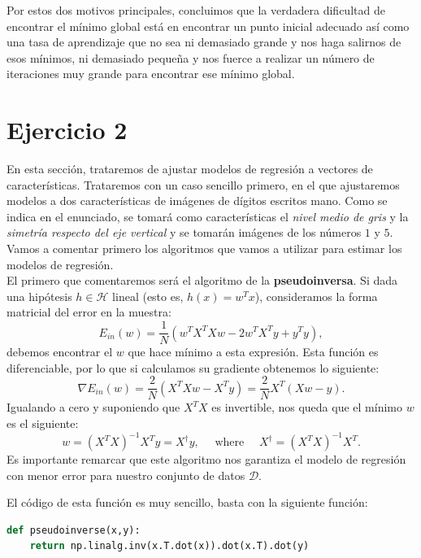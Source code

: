 \documentclass[12pt]{scrartcl}
\begin{document}
{Por estos dos motivos principales, concluimos que la verdadera dificultad de encontrar el mínimo global está en encontrar un punto inicial adecuado así como una tasa de aprendizaje que no sea ni demasiado grande y nos haga salirnos de esos mínimos, ni demasiado pequeña y nos fuerce
a realizar un número de iteraciones muy grande para encontrar ese mínimo global.

\newpage 

\section*{Ejercicio 2}

En esta sección, trataremos de ajustar modelos de regresión a vectores de características. Trataremos con un caso sencillo primero, en el que ajustaremos modelos a dos características
de imágenes de dígitos escritos mano. Como se indica en el enunciado, se tomará como características el \emph{nivel medio de gris} y la \emph{simetría respecto del eje vertical} y se tomarán imágenes de los
números $1$ y $5$. Vamos a comentar primero los algoritmos que vamos a utilizar para estimar los modelos de regresión.\\ 


El primero que comentaremos será el algoritmo de la \textbf{pseudoinversa}. Si dada una hipótesis $h \in \mathcal H$ lineal (esto es, $h(x) = w^T x$), consideramos la forma matricial del error en la muestra:
$$
E_{in}(w) = \frac{1}{N} \left(  w^T X^T X w - 2w^T X^T y + y^T y\right),
$$
debemos encontrar el $w$ que hace mínimo a esta expresión. Esta función es diferenciable, por lo que si calculamos su gradiente obtenemos lo siguiente:
$$
\nabla E_{in}(w) = \frac{2}{N} \left( X^T X w - X^T y\right) = \frac{2}{N} X^T \left(  X w -  y\right).
$$
Igualando a cero y suponiendo que $X^T X$ es invertible, nos queda que el mínimo $w$ es el siguiente:
$$
w = \left(X^T X\right)^{-1} X^T y = X^\dagger y, \quad \text{ where } \quad X^\dagger = \left(X^T X\right)^{-1} X^T.
$$
Es importante remarcar que este algoritmo nos garantiza el modelo de regresión con menor error para nuestro conjunto de datos $\mathcal D$. 

El código de esta función es muy sencillo, basta con la siguiente función:
\begin{lstlisting}[language=Python]
def pseudoinverse(x,y):
	return np.linalg.inv(x.T.dot(x)).dot(x.T).dot(y)
\end{lstlisting}


}
\end{document}
